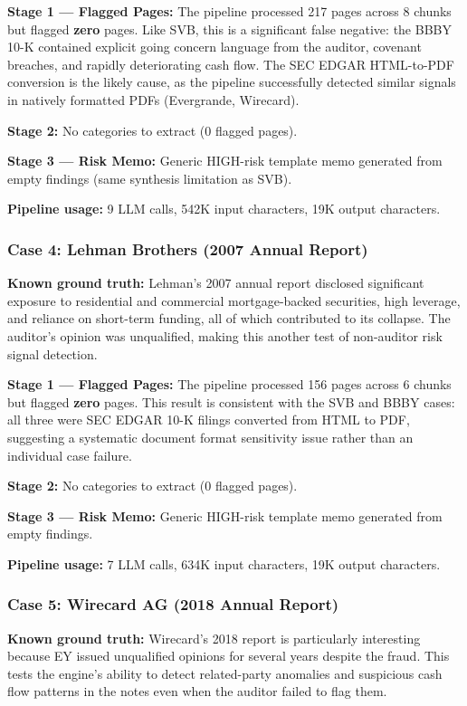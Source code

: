 \documentclass[12pt,a4paper]{article}
\begin{document}
\textbf{Stage 1 --- Flagged Pages:} The pipeline processed 217 pages across
8 chunks but flagged \textbf{zero} pages. Like SVB, this is a significant
false negative: the BBBY 10-K contained explicit going concern language
from the auditor, covenant breaches, and rapidly deteriorating cash flow.
The SEC EDGAR HTML-to-PDF conversion is the likely cause, as the pipeline
successfully detected similar signals in natively formatted PDFs (Evergrande,
Wirecard).

\textbf{Stage 2:} No categories to extract (0 flagged pages).

\textbf{Stage 3 --- Risk Memo:} Generic HIGH-risk template memo generated
from empty findings (same synthesis limitation as SVB).

\textbf{Pipeline usage:} 9 LLM calls, 542K input characters, 19K output characters.

\subsubsection{Case 4: Lehman Brothers (2007 Annual Report)}

\textbf{Known ground truth:} Lehman's 2007 annual report disclosed significant
exposure to residential and commercial mortgage-backed securities, high leverage,
and reliance on short-term funding, all of which contributed to its collapse.
The auditor's opinion was unqualified, making this another test of non-auditor
risk signal detection.

\textbf{Stage 1 --- Flagged Pages:} The pipeline processed 156 pages across
6 chunks but flagged \textbf{zero} pages. This result is consistent with the
SVB and BBBY cases: all three were SEC EDGAR 10-K filings converted from
HTML to PDF, suggesting a systematic document format sensitivity issue
rather than an individual case failure.

\textbf{Stage 2:} No categories to extract (0 flagged pages).

\textbf{Stage 3 --- Risk Memo:} Generic HIGH-risk template memo generated
from empty findings.

\textbf{Pipeline usage:} 7 LLM calls, 634K input characters, 19K output characters.

\subsubsection{Case 5: Wirecard AG (2018 Annual Report)}

\textbf{Known ground truth:} Wirecard's 2018 report is particularly interesting because
EY issued unqualified opinions for several years despite the fraud. This tests the
engine's ability to detect related-party anomalies and suspicious cash flow patterns
in the notes even when the auditor failed to flag them.
\end{document}
